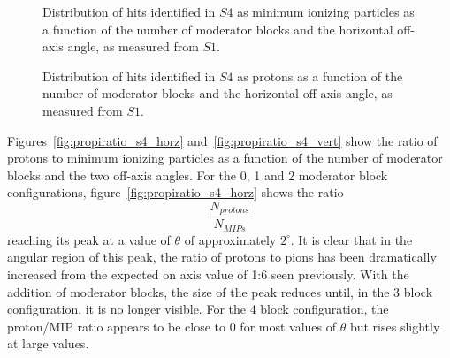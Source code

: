    	\begin{figure}[ht]
   		\begin{minipage}[t]{0.48\textwidth}
   			\begin{adjustbox}{max totalsize={\textwidth}{.35\textheight},center}
		   		
	   		\end{adjustbox}
	   		\caption{Distribution of hits identified in $S4$ as minimum ionizing particles as a function of the number of moderator blocks and the horizontal off-axis angle, as measured from $S1$.}
	   		\label{fig:thetas4mip}
   		\end{minipage}
   		\hspace{0.3cm}
   		\begin{minipage}[t]{0.48\textwidth}
	   		\begin{adjustbox}{max totalsize={\textwidth}{.35\textheight},center}
	   			
	   		\end{adjustbox}
   			\caption{Distribution of hits identified in $S4$ as protons as a function of the number of moderator blocks and the horizontal off-axis angle, as measured from $S1$.}
   			\label{fig:thetas4pro}
   		\end{minipage} 
	\end{figure}	
        
     Figures~\ref{fig:propiratio_s4_horz} and~\ref{fig:propiratio_s4_vert} show the ratio of protons to minimum ionizing particles as a function of the number of moderator blocks and the two off-axis angles.
     For the 0, 1 and 2 moderator block configurations, figure~\ref{fig:propiratio_s4_horz} shows the ratio
     \begin{equation*}
     \frac{N_{protons}}{N_{MIPs}}
     \end{equation*}	
     reaching its peak at a value of $\theta$ of approximately $2^{\circ}$.
     It is clear that in the angular region of this peak, the ratio of protons to pions has been dramatically increased from the expected on axis value of 1:6 seen previously.
     With the addition of moderator blocks, the size of the peak reduces until, in the 3 block configuration, it is no longer visible. 
     For the 4 block configuration, the proton/MIP ratio appears to be close to 0 for most values of $\theta$ but rises slightly at large values.
     

